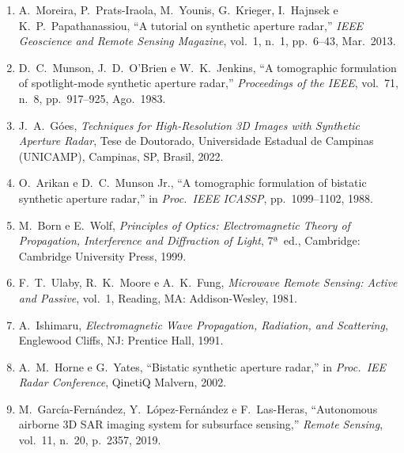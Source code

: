 \documentclass[12pt,a4paper,oneside]{book}
\theoremstyle{remark}
\theoremstyle{plain}
\theoremstyle{definition}
\begin{document}
\begin{enumerate}

  \item \label{ref:moreira2013}
  A.\ Moreira, P.\ Prats-Iraola, M.\ Younis, G.\ Krieger, I.\ Hajnsek e
  K.\ P.\ Papathanassiou, ``A tutorial on synthetic aperture radar,''
  \textit{IEEE Geoscience and Remote Sensing Magazine}, vol.\ 1, n.\ 1,
  pp.\ 6--43, Mar.\ 2013.

  \item \label{ref:munson1983}
  D.\ C.\ Munson, J.\ D.\ O'Brien e W.\ K.\ Jenkins, ``A tomographic
  formulation of spotlight-mode synthetic aperture radar,''
  \textit{Proceedings of the IEEE}, vol.\ 71, n.\ 8, pp.\ 917--925, Ago.\ 1983.

  \item \label{ref:goes2022}
  J.\ A.\ Góes, \textit{Techniques for High-Resolution 3D Images with
  Synthetic Aperture Radar}, Tese de Doutorado, Universidade Estadual de
  Campinas (UNICAMP), Campinas, SP, Brasil, 2022.

  \item \label{ref:arikan1988}
  O.\ Arikan e D.\ C.\ Munson Jr., ``A tomographic formulation of bistatic
  synthetic aperture radar,'' in \textit{Proc.\ IEEE ICASSP}, pp.\ 1099--1102,
  1988.

  \item \label{ref:bornwolf1999}
  M.\ Born e E.\ Wolf, \textit{Principles of Optics: Electromagnetic Theory
  of Propagation, Interference and Diffraction of Light}, 7ª~ed.,
  Cambridge: Cambridge University Press, 1999.

  \item \label{ref:ulaby1981}
  F.\ T.\ Ulaby, R.\ K.\ Moore e A.\ K.\ Fung, \textit{Microwave Remote
  Sensing: Active and Passive}, vol.\ 1, Reading, MA: Addison-Wesley, 1981.

  \item \label{ref:ishimaru1991}
  A.\ Ishimaru, \textit{Electromagnetic Wave Propagation, Radiation, and
  Scattering}, Englewood Cliffs, NJ: Prentice Hall, 1991.

  \item \label{ref:horne2002}
  A.\ M.\ Horne e G.\ Yates, ``Bistatic synthetic aperture radar,''
  in \textit{Proc.\ IEE Radar Conference}, QinetiQ Malvern, 2002.

  \item \label{ref:garcia2019}
  M.\ García-Fernández, Y.\ López-Fernández e F.\ Las-Heras,
  ``Autonomous airborne 3D SAR imaging system for subsurface sensing,''
  \textit{Remote Sensing}, vol.\ 11, n.\ 20, p.\ 2357, 2019.


\end{enumerate}
\end{document}
